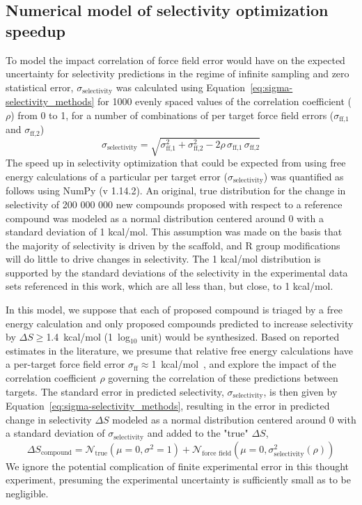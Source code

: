 \documentclass[phd,tocprelim]{cornell}
\begin{document}
\subsection{Numerical model of selectivity optimization speedup}
To model the impact correlation of force field error would have on the expected uncertainty for selectivity predictions in the regime of infinite sampling and zero statistical error, $\sigma_\text{selectivity}$ was calculated using Equation~\ref{eq:sigma-selectivity_methods} for 1000 evenly spaced values of the correlation coefficient ($\rho$) from 0 to 1, for a number of combinations of per target force field errors ($\sigma_\text{ff,1}$ and $\sigma_\text{ff,2}$) 
\begin{equation}\label{eq:sigma-selectivity_methods}
\sigma_\text{selectivity} = \sqrt{\sigma_\text{ff,1}^2 + \sigma_\text{ff,2}^2 - 2 \rho \, \sigma_\text{ff,1} \, \sigma_\text{ff,2}}
\end{equation}
The speed up in selectivity optimization that could be expected from using free energy calculations of a particular per target error ($\sigma_\text{selectivity}$) was quantified as follows using NumPy (v 1.14.2). 
An original, true distribution for the change in selectivity of 200 000 000 new compounds proposed with respect to a reference compound was modeled as a normal distribution centered around 0 with a standard deviation of 1 kcal/mol. 
This assumption was made on the basis that the majority of selectivity is driven by the scaffold, and R group modifications will do little to drive changes in selectivity. The 1 kcal/mol distribution is supported by the standard deviations of the selectivity in the experimental data sets referenced in this work, which are all less than, but close, to 1 kcal/mol. 

In this model, we suppose that each of proposed compound is triaged by a free energy calculation and only proposed compounds predicted to increase selectivity by $\Delta S \ge $1.4~kcal/mol (1~log$_{10}$ unit) would be synthesized.
Based on reported estimates in the literature, 
we presume that relative free energy calculations have a per-target force field error $\sigma_\text{ff} \approx $1~kcal/mol~\citep{Harder2016-zn}, and explore the impact of the correlation coefficient $\rho$ governing the correlation of these predictions between targets. 
The standard error in predicted selectivity, $\sigma_\text{selectivity}$, is then given by Equation~\ref{eq:sigma-selectivity_methods}, resulting in the error in predicted change in selectivity $\Delta S$ modeled as a normal distribution centered around 0 with a standard deviation of $\sigma_\text{selectivity}$ and added to the "true" $\Delta S$,
\begin{equation}\label{eq14}
\Delta S_\text{compound} = \mathcal{N}_\text{true}(\mu =0, \sigma^2 = 1) + \mathcal{N}_\text{force field}(\mu =0, \sigma_\text{selectivity}^2(\rho))
\end{equation}
We ignore the potential complication of finite experimental error in this thought experiment, presuming the experimental uncertainty is sufficiently small as to be negligible.
\end{document}
